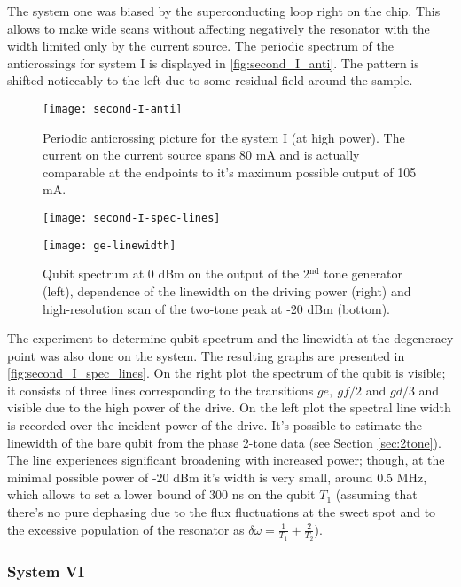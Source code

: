 \documentclass[12pt, twoside]{report}
\numberwithin{equation}{section}
\begin{document}
The system one was biased by the superconducting loop right on the chip. This allows to make wide scans without affecting negatively the resonator with the width limited only by the current source. The periodic spectrum of the anticrossings for system I is displayed in \autoref{fig:second_I_anti}. The pattern is shifted noticeably to the left due to some residual field around the sample.

\begin{figure}[h]
\centering
\texttt{[image: second-I-anti]}
\caption{Periodic anticrossing picture for the system I (at high power). The current on the current source spans 80 mA and is actually comparable at the endpoints to it's maximum possible output of 105 mA.}
\label{fig:second_I_anti}
\end{figure}

\begin{figure}[h]
\centering
\texttt{[image: second-I-spec-lines]}

\texttt{[image: ge-linewidth]}
\caption{Qubit spectrum at 0 dBm on the output of the 2$^{\text{nd}}$ tone generator (left), dependence of the linewidth on the driving power (right) and high-resolution scan of the two-tone peak at -20 dBm (bottom).}
\label{fig:second_I_spec_lines}
\end{figure}


The experiment to determine qubit spectrum and the linewidth at the degeneracy point was also done on the system. The resulting graphs are presented in \autoref{fig:second_I_spec_lines}. On the right plot the spectrum of the qubit is visible; it consists of three lines corresponding to the transitions $ge,\ gf/2$ and $gd/3$ and visible due to the high power of the drive. On the left plot the spectral line width is recorded over the incident power of the drive. It's possible to estimate the linewidth of the bare qubit from the phase 2-tone data (see Section \ref{sec:2tone}). The line experiences significant broadening with increased power; though, at the minimal possible power of -20 dBm it's width is very small, around 0.5 MHz, which allows to set a lower bound of 300 ns on the qubit $T_1$ (assuming that there's no pure dephasing due to the flux fluctuations at the sweet spot and to the excessive population of the resonator as $\delta\omega = \frac{1}{T_1}+\frac{2}{T_2}$).

\subsubsection{System VI}
\end{document}
